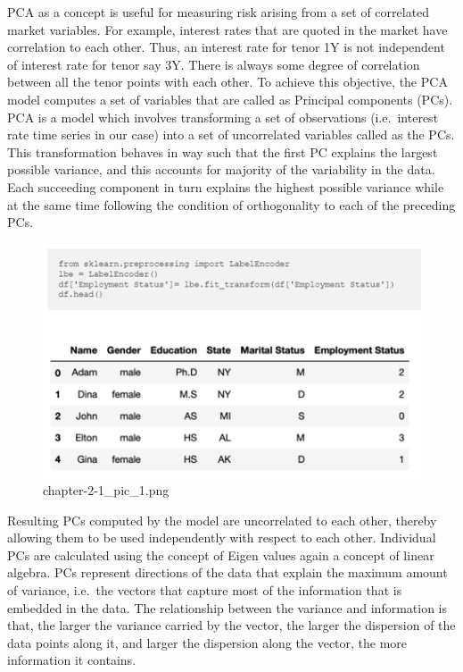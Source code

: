 \documentclass[11pt]{article}
\begin{document}
    PCA as a concept is useful for measuring risk arising from a set of
correlated market variables. For example, interest rates that are quoted
in the market have correlation to each other. Thus, an interest rate for
tenor 1Y is not independent of interest rate for tenor say 3Y. There is
always some degree of correlation between all the tenor points with each
other. To achieve this objective, the PCA model computes a set of
variables that are called as Principal components (PCs). PCA is a model
which involves transforming a set of observations (i.e.~interest rate
time series in our case) into a set of uncorrelated variables called as
the PCs. This transformation behaves in way such that the first PC
explains the largest possible variance, and this accounts for majority
of the variability in the data. Each succeeding component in turn
explains the highest possible variance while at the same time following
the condition of orthogonality to each of the preceding PCs.

    \begin{figure}
\centering
\includegraphics{./pic/chapter-2-1_pic_1.png}
\caption{chapter-2-1\_pic\_1.png}
\end{figure}

    Resulting PCs computed by the model are uncorrelated to each other,
thereby allowing them to be used independently with respect to each
other. Individual PCs are calculated using the concept of Eigen values
again a concept of linear algebra. PCs represent directions of the data
that explain the maximum amount of variance, i.e.~the vectors that
capture most of the information that is embedded in the data. The
relationship between the variance and information is that, the larger
the variance carried by the vector, the larger the dispersion of the
data points along it, and larger the dispersion along the vector, the
more information it contains.
\end{document}
